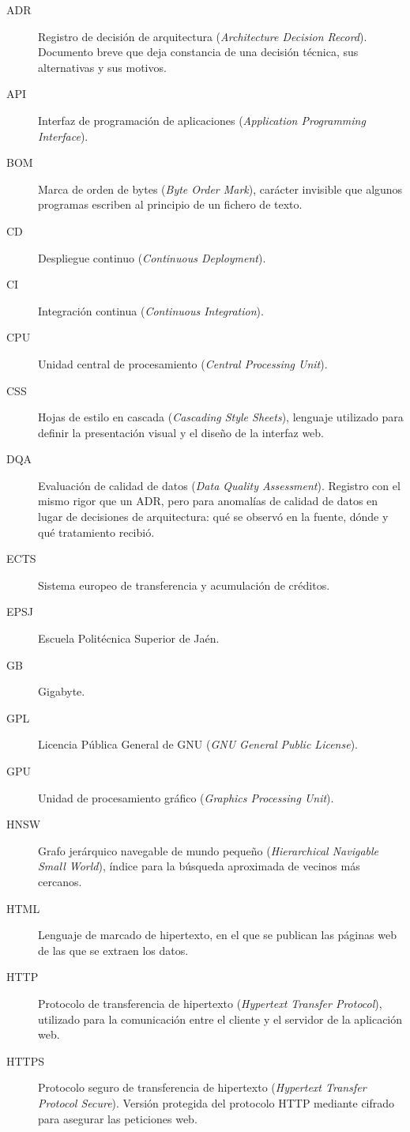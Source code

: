 \begin{description}          
  \item[ADR] Registro de decisión de arquitectura (\textit{Architecture
          Decision Record}). Documento breve que deja constancia de una decisión
        técnica, sus alternativas y sus motivos.
  \item[API] Interfaz de programación de aplicaciones (\textit{Application Programming Interface}).
  \item[BOM] Marca de orden de bytes (\textit{Byte Order Mark}), carácter invisible que algunos programas escriben al principio de un fichero de texto.
  \item[CD] Despliegue continuo (\textit{Continuous Deployment}).
  \item[CI] Integración continua (\textit{Continuous Integration}).
  \item[CPU] Unidad central de procesamiento (\textit{Central Processing Unit}).
  \item[CSS] Hojas de estilo en cascada
        (\textit{Cascading Style Sheets}), lenguaje utilizado para definir la
        presentación visual y el diseño de la interfaz web.
  \item[DQA] Evaluación de calidad de datos (\textit{Data Quality
          Assessment}). Registro con el mismo rigor que un ADR, pero para
        anomalías de calidad de datos en lugar de decisiones de arquitectura:
        qué se observó en la fuente, dónde y qué tratamiento recibió.
  \item[ECTS] Sistema europeo de transferencia y acumulación de créditos.
  \item[EPSJ] Escuela Politécnica Superior de Jaén.
  \item[GB] Gigabyte.
  \item[GPL] Licencia Pública General de GNU (\textit{GNU General Public License}).
  \item[GPU] Unidad de procesamiento gráfico (\textit{Graphics Processing Unit}).
  \item[HNSW] Grafo jerárquico navegable de mundo pequeño (\textit{Hierarchical Navigable Small World}), índice para la búsqueda aproximada de vecinos más cercanos.
  \item[HTML] Lenguaje de marcado de hipertexto, en el que se publican las
        páginas web de las que se extraen los datos.
    \item[HTTP] Protocolo de transferencia de hipertexto (\textit{Hypertext Transfer Protocol}), 
        utilizado para la comunicación entre el cliente y el servidor de la aplicación web.
  \item[HTTPS] Protocolo seguro de transferencia de
        hipertexto (\textit{Hypertext Transfer Protocol Secure}). Versión protegida
        del protocolo HTTP mediante cifrado  para asegurar las peticiones web.



\end{description}
